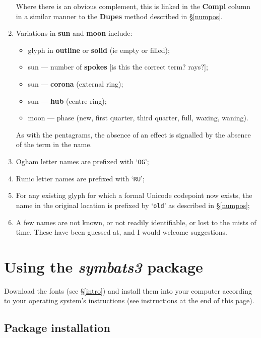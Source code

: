 \documentclass{article}
\begin{document}
\begin{multicols*}{2}
\begin{enumerate}
  Where there is an obvious complement, this is linked in the
  \textbf{Compl} column in a similar manner to the \textbf{Dupes}
  method described in \hyperref[numpos]{\S\ref{numpos}}.

\item Variations in \textbf{sun} and \textbf{moon} include:
  \begin{itemize}[nosep]
  \item glyph in \textbf{outline} or \textbf{solid} (ie empty or filled);
  \item sun — number of \textbf{spokes} [is this the correct term? rays?];
  \item sun — \textbf{corona} (external ring);
  \item sun — \textbf{hub} (centre ring);
  \item moon — phase (new, first quarter, third quarter, full, waxing,
    waning).
  \end{itemize}
  As with the pentagrams, the absence of an effect is signalled by
  the absence of the term in the name.

\item Ogham letter names are prefixed with `\texttt{OG}';

\item Runic letter names are prefixed with `\texttt{RU}';

\item For any existing glyph for which a formal Unicode codepoint now
  exists, the name in the original location is prefixed by
  `\texttt{old}' as described in \hyperref[numpos]{\S\ref{numpos}};

\item A few names are not known, or not readily identifiable, or lost
  to the mists of time. These have been guessed at, and I would
  welcome suggestions.
  
\end{enumerate}

\section{Using the \textit{symbats3} package}

Download the fonts (see \S\ref{intro}) and install them into
  your computer according to your operating system's instructions
  (see instructions at the end of this page).

\subsection{Package installation}


\end{multicols*}
\end{document}
